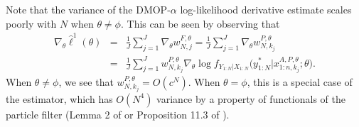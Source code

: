Note that the variance of the DMOP-$\alpha$ log-likelihood derivative estimate scales poorly with $N$ when $\theta\neq\phi$. 
This can be seen by observing that
\begin{eqnarray}
    \nabla_\theta \hat{\ell}^1(\theta) &=& \frac{1}{J}\sum_{j=1}^J \nabla_\theta w_{N,j}^{F,\theta} =\frac{1}{J}\sum_{j=1}^J \nabla_\theta w_{N,k_j}^{P,\theta}
\nonumber \\
&=& \frac{1}{J}\sum_{j=1}^J w_{N,k_j}^{P,\theta} \nabla_\theta \log f_{Y_{1:N}|X_{1:N}}\big(y_{1:N}^* | x_{1:n,k_j}^{A, P,\theta}; \theta \big).
\end{eqnarray}
When $\theta\neq\phi$, we see that $w_{N,k_j}^{P,\theta} = O(c^N)$. 
When $\theta=\phi$, this is a special case of the \cite{poyiadjis11} estimator, which has $O(N^4)$ variance by a property of functionals of the particle filter (Lemma 2 of \cite{karjalainen23} or Proposition 11.3 of \citet{chopin20}). 

